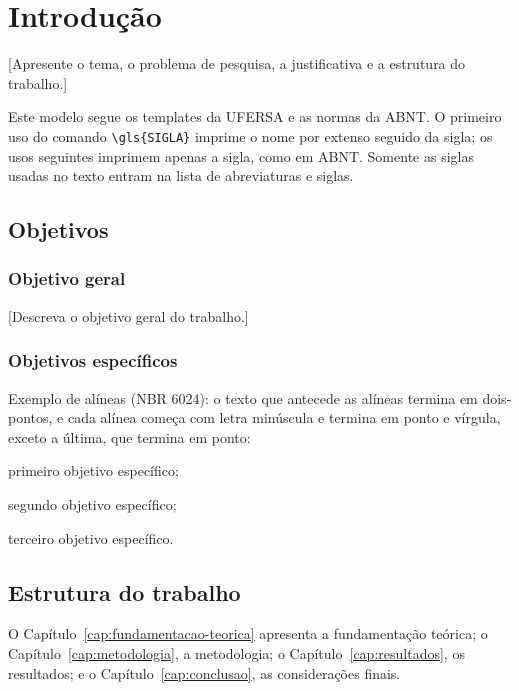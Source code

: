 \chapter{Introdução}
\label{cap:introducao}


[Apresente o tema, o problema de pesquisa, a justificativa e a estrutura do trabalho.]

Este modelo segue os templates da \gls{UFERSA} e as normas da \gls{ABNT}. O primeiro uso do comando \texttt{\textbackslash gls\{SIGLA\}} imprime o nome por extenso seguido da sigla; os usos seguintes imprimem apenas a sigla, como em \gls{ABNT}. Somente as siglas usadas no texto entram na lista de abreviaturas e siglas.

\section{Objetivos}


\subsection{Objetivo geral}


[Descreva o objetivo geral do trabalho.]

\subsection{Objetivos específicos}

Exemplo de alíneas (NBR 6024): o texto que antecede as alíneas termina em dois-pontos, e cada alínea começa com letra minúscula e termina em ponto e vírgula, exceto a última, que termina em ponto:

\begin{alineas}
	\item primeiro objetivo específico;
	\item segundo objetivo específico;
	\item terceiro objetivo específico.
\end{alineas}

\section{Estrutura do trabalho}

O Capítulo~\ref{cap:fundamentacao-teorica} apresenta a fundamentação teórica; o Capítulo~\ref{cap:metodologia}, a metodologia; o Capítulo~\ref{cap:resultados}, os resultados; e o Capítulo~\ref{cap:conclusao}, as considerações finais.
